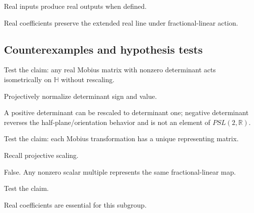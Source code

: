 \begin{hint}
Real inputs produce real outputs when defined.
\end{hint}

\begin{solution}
Real coefficients preserve the extended real line under fractional-linear action.
\end{solution}

\subsection*{Counterexamples and hypothesis tests}

\begin{exercise}\label{exr:vii33-ped-10}
Test the claim: any real Mobius matrix with nonzero determinant acts isometrically on \(\mathbb H\) without rescaling.
\end{exercise}

\begin{hint}
Projectively normalize determinant sign and value.
\end{hint}

\begin{solution}
A positive determinant can be rescaled to determinant one; negative determinant reverses the half-plane/orientation behavior and is not an element of \(PSL(2,\mathbb R)\).
\end{solution}

\begin{exercise}\label{exr:vii33-ped-11}
Test the claim: each Mobius transformation has a unique representing matrix.
\end{exercise}

\begin{hint}
Recall projective scaling.
\end{hint}

\begin{solution}
False.  Any nonzero scalar multiple represents the same fractional-linear map.
\end{solution}

\begin{exercise}\label{exr:vii33-ped-12}
Test the claim.
\end{exercise}

\begin{hint}
Real coefficients are essential for this subgroup.
\end{hint}

